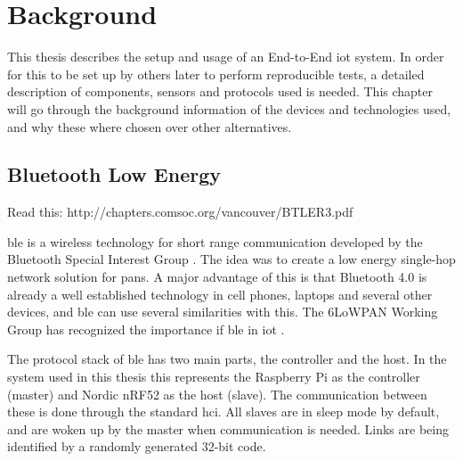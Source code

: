 \chapter{Background}
\label{chp:background} 

This thesis describes the setup and usage of an End-to-End \gls{iot} system. In order for this to be set up by others later to perform reproducible tests, a detailed description of components, sensors and protocols used is needed. This chapter will go through the background information of the devices and technologies used, and why these where chosen over other alternatives. 






\section{Bluetooth Low Energy}

Read this: http://chapters.comsoc.org/vancouver/BTLER3.pdf 

\gls{ble} is a wireless technology for short range communication developed by the Bluetooth Special Interest Group \cite{gomez2012overview}. The idea was to create a low energy single-hop network solution for \glspl{pan}. A major advantage of this is that Bluetooth 4.0 is already a well established technology in cell phones, laptops and several other devices, and \gls{ble} can use several similarities with this. The 6LoWPAN Working Group has recognized the importance if \gls{ble} in \gls{iot} \cite{hui2008extending}.

The protocol stack of \gls{ble} has two main parts, the controller and the host. In the system used in this thesis this represents the Raspberry Pi as the controller (master) and Nordic nRF52 as the host (slave). The communication between these is done through the standard \gls{hci}. All slaves are in sleep mode by default, and are woken up by the master when communication is needed. Links are being identified by a randomly generated 32-bit code. 

